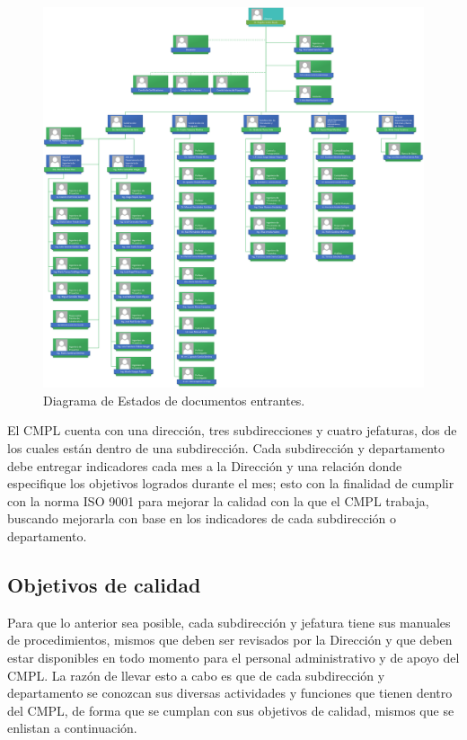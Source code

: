 	\begin{figure}[htbp!]
		\centering
			\includegraphics[width=1\textwidth]{images/antecedentes/OrganigramaCMPL.png}
		\caption{Diagrama de Estados de documentos entrantes. \cite{Organigrama}}
		\label{fig:organigrama}
	\end{figure}
	
	El CMPL cuenta con una dirección, tres subdirecciones y cuatro jefaturas, dos de los cuales están dentro de una subdirección. Cada subdirección y departamento debe entregar indicadores cada mes a la Dirección y una relación donde especifique los objetivos logrados durante el mes; esto con la finalidad de cumplir con la norma ISO 9001 para mejorar la calidad con la que el CMPL trabaja, buscando mejorarla con base en los indicadores de cada subdirección o departamento.\\
	
	\subsection{Objetivos de calidad}
	Para que lo anterior sea posible, cada subdirección y jefatura tiene sus manuales de procedimientos, mismos que deben ser revisados por la Dirección y que deben estar disponibles en todo momento para el personal administrativo y de apoyo del CMPL. La razón de llevar esto a cabo es que de cada subdirección y departamento se conozcan sus diversas actividades y funciones que tienen dentro del CMPL, de forma que se cumplan con sus objetivos de calidad, mismos que se enlistan a continuación.\\
	
